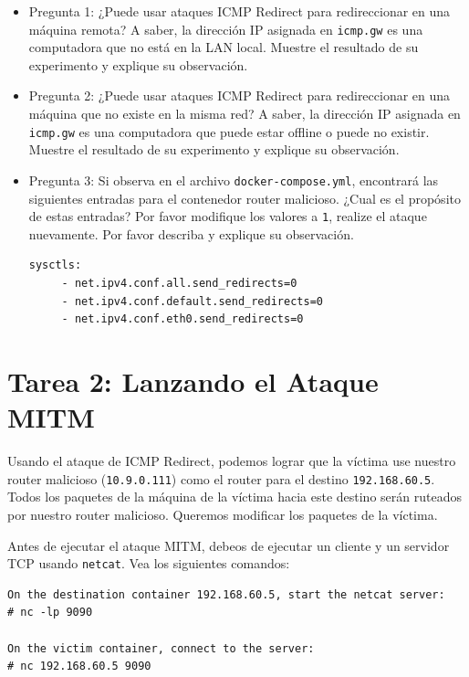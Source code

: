 \begin{itemize}
\item Pregunta 1: ¿Puede usar ataques ICMP Redirect para redireccionar en una máquina remota? A saber, la dirección IP asignada en \texttt{icmp.gw} es una computadora que no está en la LAN local. Muestre el resultado de su experimento y explique su observación.


\item Pregunta 2:  ¿Puede usar ataques ICMP Redirect para redireccionar en una máquina que no existe en la misma red? A saber, la dirección IP asignada en \texttt{icmp.gw} es una computadora que puede estar offline o puede no existir. Muestre el resultado de su experimento y explique su observación.


\item Pregunta 3: Si observa en el archivo \texttt{docker-compose.yml}, encontrará las siguientes entradas para el contenedor router malicioso. ¿Cual es el propósito de estas entradas? Por favor modifique los valores a \texttt{1}, realize el ataque nuevamente.
Por favor describa y explique su observación.

\begin{lstlisting}
sysctls:
     - net.ipv4.conf.all.send_redirects=0
     - net.ipv4.conf.default.send_redirects=0
     - net.ipv4.conf.eth0.send_redirects=0
\end{lstlisting}
 
\end{itemize}



\section{Tarea 2: Lanzando el Ataque MITM} 

Usando el ataque de ICMP Redirect, podemos lograr que la víctima use nuestro router malicioso (\texttt{10.9.0.111}) como el router para el destino \texttt{192.168.60.5}. Todos los paquetes de la máquina de la víctima hacia este destino serán ruteados por nuestro router malicioso.
Queremos modificar los paquetes de la víctima.

Antes de ejecutar el ataque MITM, debeos de ejecutar un cliente y un servidor TCP usando \texttt{netcat}. Vea los siguientes comandos:

\begin{lstlisting}
On the destination container 192.168.60.5, start the netcat server:
# nc -lp 9090

On the victim container, connect to the server:
# nc 192.168.60.5 9090
\end{lstlisting}



